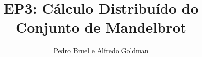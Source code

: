 \documentclass[final,12pt,a4paper]{elsarticle}
\begin{document}
\begin{frontmatter}


\title{EP3: Cálculo Distribuído do Conjunto de Mandelbrot}




\author{Pedro Bruel e Alfredo Goldman}

\address{MAC 5742-0219 Introdução à Programação Concorrente, Paralela e Distribuída}




\end{frontmatter}
\end{document}
